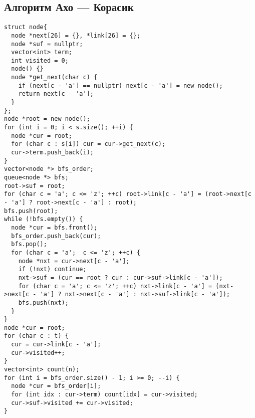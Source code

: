 \subsection{Алгоритм Ахо --- Корасик}
\begin{lstlisting}
struct node{
  node *next[26] = {}, *link[26] = {};
  node *suf = nullptr;
  vector<int> term;
  int visited = 0;
  node() {}
  node *get_next(char c) {
    if (next[c - 'a'] == nullptr) next[c - 'a'] = new node();
    return next[c - 'a'];
  }
};
node *root = new node();
for (int i = 0; i < s.size(); ++i) {
  node *cur = root;
  for (char c : s[i]) cur = cur->get_next(c);
  cur->term.push_back(i);
}
vector<node *> bfs_order;
queue<node *> bfs;
root->suf = root;
for (char c = 'a'; c <= 'z'; ++c) root->link[c - 'a'] = (root->next[c - 'a'] ? root->next[c - 'a'] : root);
bfs.push(root);
while (!bfs.empty()) {
  node *cur = bfs.front();
  bfs_order.push_back(cur);
  bfs.pop();
  for (char c = 'a';  c <= 'z'; ++c) {
    node *nxt = cur->next[c - 'a'];
    if (!nxt) continue;
    nxt->suf = (cur == root ? cur : cur->suf->link[c - 'a']);
    for (char c = 'a'; c <= 'z'; ++c) nxt->link[c - 'a'] = (nxt->next[c - 'a'] ? nxt->next[c - 'a'] : nxt->suf->link[c - 'a']);
    bfs.push(nxt);
  }
}
node *cur = root;
for (char c : t) {
  cur = cur->link[c - 'a'];
  cur->visited++;
}
vector<int> count(n);
for (int i = bfs_order.size() - 1; i >= 0; --i) {
  node *cur = bfs_order[i];
  for (int idx : cur->term) count[idx] = cur->visited;
  cur->suf->visited += cur->visited;
}
\end{lstlisting}